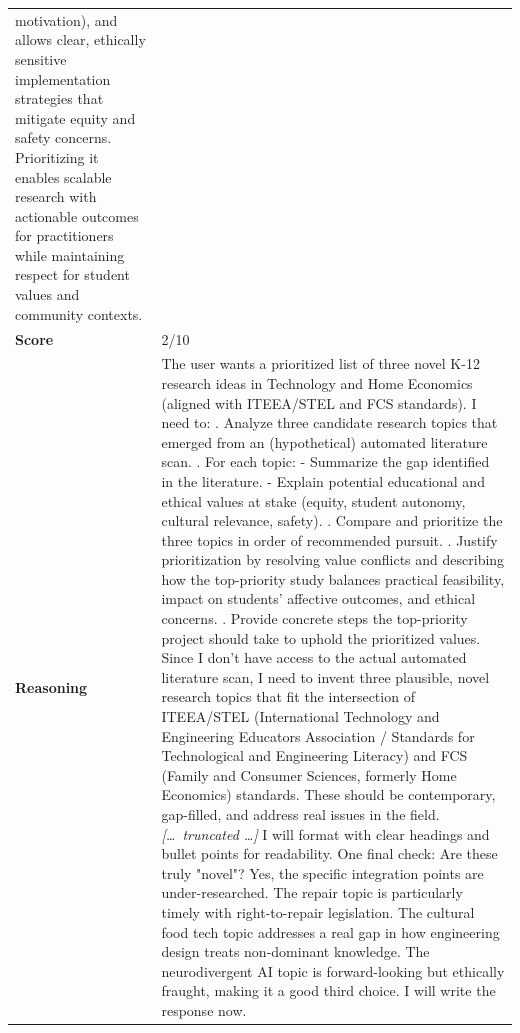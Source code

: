 \begin{longtable}{@{}l p{13cm}@{}}
motivation), and allows clear, ethically sensitive implementation strategies that mitigate equity and safety concerns. Prioritizing it enables scalable research with actionable outcomes for practitioners while maintaining respect for student values and community contexts.      \\
  \textbf{Score}     & 2/10  \\
  \textbf{Reasoning} & The user wants a prioritized list of three novel K-12 research ideas in Technology and Home Economics (aligned with ITEEA/STEL and FCS standards). I need to: \newline 1. Analyze three candidate research topics that emerged from an (hypothetical) automated literature scan. \newline 2. For each topic: \newline - Summarize the gap identified in the literature. \newline - Explain potential educational and ethical values at stake (equity, student autonomy, cultural relevance, safety). \newline 3. Compare and prioritize the three topics in order of recommended pursuit. \newline 4. Justify prioritization by resolving value conflicts and describing how the top-priority study balances practical feasibility, impact on students' affective outcomes, and ethical concerns. \newline 5. Provide concrete steps the top-priority project should take to uphold the prioritized values. \newline Since I don't have access to the actual automated literature scan, I need to invent three plausible, novel research topics that fit the intersection of ITEEA/STEL (International Technology and Engineering Educators Association / Standards for Technological and Engineering Literacy) and FCS (Family and Consumer Sciences, formerly Home Economics) standards. These should be contemporary, gap-filled, and address real issues in the field. \newline \textit{[\ldots\ truncated \ldots]} \newline I will format with clear headings and bullet points for readability. \newline One final check: Are these truly "novel"? Yes, the specific integration points are under-researched. The repair topic is particularly timely with right-to-repair legislation. The cultural food tech topic addresses a real gap in how engineering design treats non-dominant knowledge. The neurodivergent AI topic is forward-looking but ethically fraught, making it a good third choice. \newline I will write the response now.  \\

\end{longtable}

